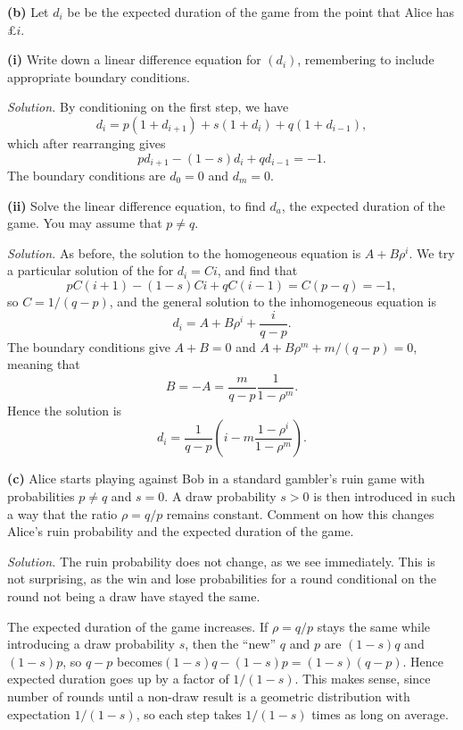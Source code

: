 \documentclass[
  a4paper,
]{article}
\theoremstyle{definition}
\theoremstyle{definition}
\theoremstyle{definition}
\theoremstyle{remark}
\begin{document}
\textbf{(b)} Let \(d_i\) be be the expected duration of the game from the point that Alice has £\(i\).

\textbf{(i)} Write down a linear difference equation for \((d_i)\), remembering to include appropriate boundary conditions.

\begin{myanswers}

\emph{Solution.} By conditioning on the first step, we have
\[ d_i = p(1 + d_{i+1}) + s(1 + d_i) + q(1 + d_{i-1}) ,  \]
which after rearranging gives
\[ pd_{i+1} - (1-s)d_i + qd_{i-1} = -1.  \]
The boundary conditions are \(d_0 = 0\) and \(d_m = 0\).

\end{myanswers}

\textbf{(ii)} Solve the linear difference equation, to find \(d_a\), the expected duration of the game. You may assume that \(p \neq q\).

\begin{myanswers}

\emph{Solution.} As before, the solution to the homogeneous equation is \(A + B\rho^i\). We try a particular solution of the for \(d_i = Ci\), and find that
\[ pC(i+1) -(1-s)Ci + qC(i-1) = C(p-q) = -1 ,\]
so \(C= 1/(q-p)\), and the general solution to the inhomogeneous equation is
\[ d_i = A + B\rho^i + \frac{i}{q-p} .  \]
The boundary conditions give \(A + B = 0\) and \(A + B \rho^m + m/(q-p) = 0\), meaning that
\[ B = -A = \frac{m}{q-p} \frac{1}{1-\rho^m} . \]
Hence the solution is
\[ d_i = \frac{1}{q-p} \left(i - m\frac{1-\rho^i}{1-\rho^m} \right) .   \]

\end{myanswers}

\textbf{(c)} Alice starts playing against Bob in a standard gambler's ruin game with probabilities \(p \neq q\) and \(s = 0\). A draw probability \(s > 0\) is then introduced in such a way that the ratio \(\rho = q/p\) remains constant. Comment on how this changes Alice's ruin probability and the expected duration of the game.

\begin{myanswers}

\emph{Solution.} The ruin probability does not change, as we see immediately. This is not surprising, as the win and lose probabilities for a round conditional on the round not being a draw have stayed the same.

The expected duration of the game increases. If \(\rho = q/p\) stays the same while introducing a draw probability \(s\), then the ``new'' \(q\) and \(p\) are \((1-s)q\) and \((1-s)p\), so \(q-p\) becomes\((1-s)q - (1-s)p = (1-s)(q-p)\). Hence expected duration goes up by a factor of \(1/(1-s)\). This makes sense, since number of rounds until a non-draw result is a geometric distribution with expectation \(1/(1-s)\), so each step takes \(1/(1-s)\) times as long on average.

\end{myanswers}
\end{document}
